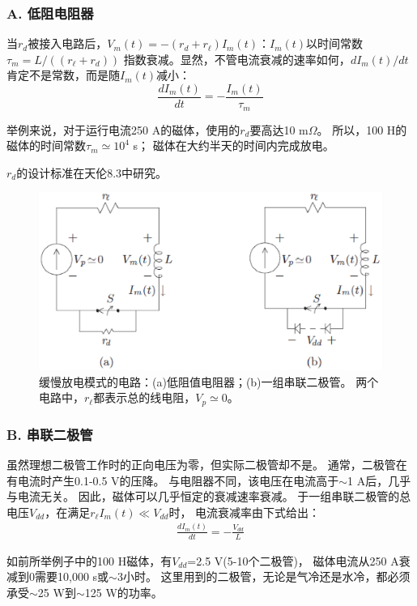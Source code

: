 \subsubsection*{A. 低阻电阻器}
当$r_d$被接入电路后，$V_m(t)=-(r_d+r_\ell)I_m(t)$：$I_m(t)$以时间常数$\tau_m=L/((r_\ell+r_d))$
指数衰减。显然，不管电流衰减的速率如何，$dI_m(t)/dt$肯定不是常数，而是随$I_m(t)$减小：
\begin{equation}%
\frac{dI_m(t)}{dt}=-\frac{I_m(t)}{\tau_m}
\end{equation}

举例来说，对于运行电流250 A的磁体，使用的$r_d$要高达10 m$\Omega$。
所以，100 H的磁体的时间常数$\tau_m\simeq 10^4$ s；
磁体在大约半天的时间内完成放电。

$r_d$的设计标准在天伦8.3中研究。

\begin{figure}
	\centering
	\includegraphics[scale=0.6]{chpt8/figs/fig8.23.eps}
	\caption{缓慢放电模式的电路：(a)低阻值电阻器；(b)一组串联二极管。
		两个电路中，$r_\ell$都表示总的线电阻，$V_p\simeq 0$。}
\end{figure}

\subsubsection*{B. 串联二极管}
虽然理想二极管工作时的正向电压为零，但实际二极管却不是。
通常，二极管在有电流时产生0.1-0.5 V的压降。
 与电阻器不同，该电压在电流高于$\sim$1 A后，几乎与电流无关。
  因此，磁体可以几乎恒定的衰减速率衰减。
  于一组串联二极管的总电压$V_{dd}$，在满足$r_\ell I_m(t)\ll V_{dd}$时，
  电流衰减率由下式给出：
\begin{align*}%
\frac{dI_m(t)}{dt}=-\frac{V_{dd}}{L} \tag{8.77b}
\end{align*}

如前所举例子中的100 H磁体，有$V_{dd}$=2.5 V(5-10个二极管)，
磁体电流从250 A衰减到0需要10,000 s或$\sim$3小时。
这里用到的二极管，无论是气冷还是水冷，都必须承受$\sim$25 W到$\sim$125 W的功率。


